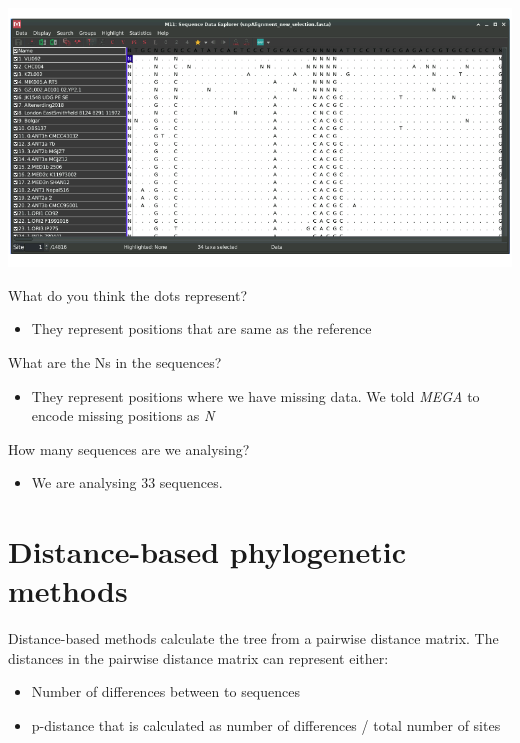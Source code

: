 \documentclass[
  letterpaper,
]{book}
\providecommand{\tightlist}{%
  \setlength{\itemsep}{0pt}\setlength{\parskip}{0pt}}\usepackage{longtable,booktabs,array}
\begin{document}
\includegraphics{assets/images/chapters/phylogenomics/6.png}

What do you think the dots represent?

\begin{itemize}
\tightlist
\item
  They represent positions that are same as the reference
\end{itemize}

What are the Ns in the sequences?

\begin{itemize}
\tightlist
\item
  They represent positions where we have missing data. We told
  \emph{MEGA} to encode missing positions as \emph{N}
\end{itemize}

How many sequences are we analysing?

\begin{itemize}
\tightlist
\item
  We are analysing 33 sequences.
\end{itemize}

\hypertarget{distance-based-phylogenetic-methods}{%
\section{Distance-based phylogenetic
methods}\label{distance-based-phylogenetic-methods}}

Distance-based methods calculate the tree from a pairwise distance
matrix. The distances in the pairwise distance matrix can represent
either:

\begin{itemize}
\tightlist
\item
  Number of differences between to sequences
\item
  p-distance that is calculated as number of differences / total number
  of sites
\end{itemize}
\end{document}
